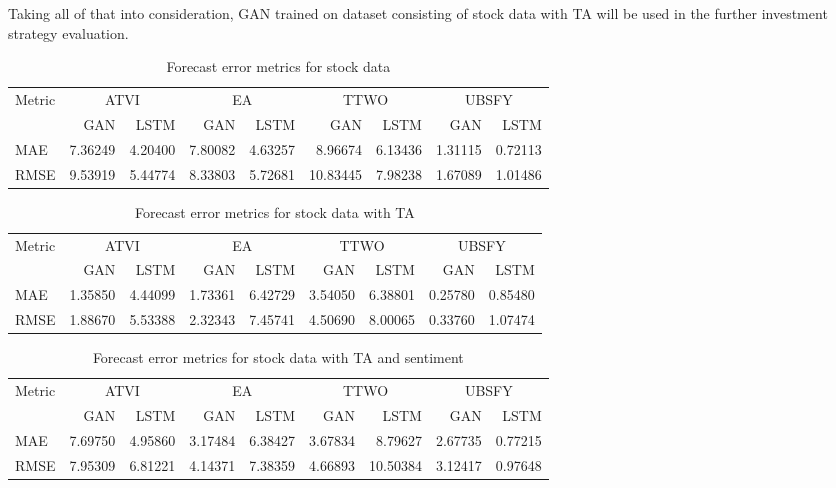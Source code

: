 \documentclass[review]{elsarticle} %
\begin{document}
Taking all of that into consideration, GAN trained on dataset consisting of stock data with TA will be used in the further investment strategy evaluation.


\begin{table}[H]
       \centering
       \caption{Forecast error metrics for stock data}
       \begin{tabular}{lrrrrrrrr}
       \toprule
       Metric & \multicolumn{2}{c}{ATVI} & \multicolumn{2}{c}{EA} & \multicolumn{2}{c}{TTWO} & \multicolumn{2}{c}{UBSFY} \\
       & GAN & LSTM & GAN & LSTM & GAN & LSTM & GAN & LSTM \\
       \midrule
       MAE & 7.36249 & 4.20400 & 7.80082 & 4.63257 & 8.96674 & 6.13436 & 1.31115 & 0.72113 \\
       RMSE & 9.53919 & 5.44774 & 8.33803 & 5.72681 & 10.83445 & 7.98238 & 1.67089 & 1.01486 \\
       \bottomrule
       \end{tabular}
       \end{table}
       
       \begin{table}[H]
       \centering
       \caption{Forecast error metrics for stock data with TA}
       \begin{tabular}{lrrrrrrrr}
       \toprule
       Metric & \multicolumn{2}{c}{ATVI} & \multicolumn{2}{c}{EA} & \multicolumn{2}{c}{TTWO} & \multicolumn{2}{c}{UBSFY} \\
       & GAN & LSTM & GAN & LSTM & GAN & LSTM & GAN & LSTM \\
       \midrule
       MAE & 1.35850 & 4.44099 & 1.73361 & 6.42729 & 3.54050 & 6.38801 & 0.25780 & 0.85480 \\
       RMSE & 1.88670 & 5.53388 & 2.32343 & 7.45741 & 4.50690 & 8.00065 & 0.33760 & 1.07474 \\
       \bottomrule
       \end{tabular}
       \end{table}
       
       \begin{table}[H]
       \centering
       \caption{Forecast error metrics for stock data with TA and sentiment}
       \begin{tabular}{lrrrrrrrr}
       \toprule
       Metric & \multicolumn{2}{c}{ATVI} & \multicolumn{2}{c}{EA} & \multicolumn{2}{c}{TTWO} & \multicolumn{2}{c}{UBSFY} \\
       & GAN & LSTM & GAN & LSTM & GAN & LSTM & GAN & LSTM \\
       \midrule
       MAE & 7.69750 & 4.95860 & 3.17484 & 6.38427 & 3.67834 & 8.79627 & 2.67735 & 0.77215 \\
       RMSE & 7.95309 & 6.81221 & 4.14371 & 7.38359 & 4.66893 & 10.50384 & 3.12417 & 0.97648 \\
       \bottomrule
       \end{tabular}
       \end{table}
       
\end{document}
